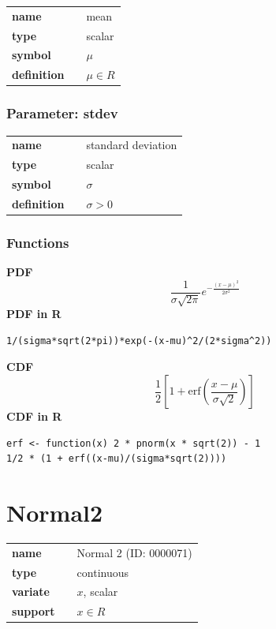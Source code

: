 \noindent\begin{tabular}{p{2cm}cl}
\textbf{name} & & mean \\
\textbf{type} & & scalar \\
\textbf{symbol} & & $\mu$  \\
\textbf{definition} & & $\mu \in  R$
\end{tabular}
\subsubsection*{Parameter: stdev}

\noindent\begin{tabular}{p{2cm}cl}
\textbf{name} & & standard deviation \\
\textbf{type} & & scalar \\
\textbf{symbol} & & $\sigma$  \\
\textbf{definition} & & $\sigma> 0$
\end{tabular}
\subsubsection*{Functions}

\smallskip \noindent \hspace{.2cm} \textbf{PDF} 
\begin{equation*}\frac{1}{\sigma \sqrt{2 \pi}}e^{-\frac{(x-\mu)^2}{2\sigma^2}}\end{equation*}
\smallskip \noindent \hspace{.2cm} \textbf{PDF in R}  
\begin{verbatim}1/(sigma*sqrt(2*pi))*exp(-(x-mu)^2/(2*sigma^2))\end{verbatim}
\smallskip \noindent \hspace{.2cm} \textbf{CDF} 
\begin{equation*}\frac12\left[1 + \text{erf}\left( \frac{x-\mu}{\sigma\sqrt{2}}\right)\right]\end{equation*}
\smallskip \noindent \hspace{.2cm} \textbf{CDF in R} 
\begin{verbatim}
erf <- function(x) 2 * pnorm(x * sqrt(2)) - 1
1/2 * (1 + erf((x-mu)/(sigma*sqrt(2))))\end{verbatim}
\smallskip\section*{Normal2} 

  \bigskip 

\begin{tabular}{p{2cm}cl}
\textbf{name} & & Normal 2 (ID: 0000071)\\ 
 
\textbf{type} & & continuous \\ 

\textbf{variate} & & $x$, scalar \\ 

\textbf{support} & & $x \in R$
\end{tabular}

